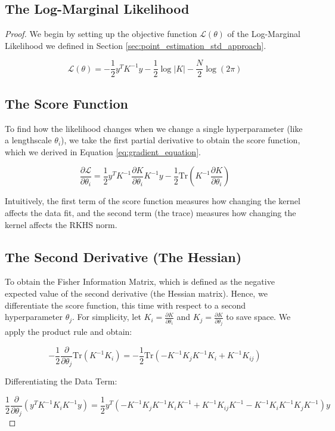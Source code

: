 \documentclass[12pt,oneside]{report}
\theoremstyle{definition}
\theoremstyle{remark}
\begin{document}
\subsection{The Log-Marginal Likelihood}
\begin{proof}
We begin by setting up the objective function $\mathcal{L}(\theta)$ of the Log-Marginal Likelihood we defined in Section \ref{sec:point_estimation_std_approach}.

$$\mathcal{L}(\theta) = -\frac{1}{2} y^T K^{-1} y - \frac{1}{2} \log \vert{}K\vert{} - \frac{N}{2} \log(2\pi)$$

\subsection{The Score Function}
To find how the likelihood changes when we change a single hyperparameter (like a lengthscale $\theta_i$), we take the first partial derivative to obtain the score function, which we derived in Equation \ref{eq:gradient_equation}. 

$$\frac{\partial \mathcal{L}}{\partial \theta_i} = \frac{1}{2} y^T K^{-1} \frac{\partial K}{\partial \theta_i} K^{-1} y - \frac{1}{2} \text{Tr}\left( K^{-1} \frac{\partial K}{\partial \theta_i} \right)$$

Intuitively, the first term of the score function measures how changing the kernel affects the data fit, and the second term (the trace) measures how changing the kernel affects the RKHS norm.

\subsection{The Second Derivative (The Hessian)}

To obtain the Fisher Information Matrix, which is defined as the negative expected value of the second derivative (the Hessian matrix). Hence, we differentiate the score function, this time with respect to a second hyperparameter $\theta_j$. For simplicity, let $K_i = \frac{\partial K}{\partial \theta_i}$ and $K_j = \frac{\partial K}{\partial \theta_j}$ to save space. We apply the product rule and obtain:

$$-\frac{1}{2} \frac{\partial}{\partial \theta_j} \text{Tr}(K^{-1} K_i) = -\frac{1}{2} \text{Tr}\left( -K^{-1} K_j K^{-1} K_i + K^{-1} K_{ij} \right)$$

Differentiating the Data Term:

\begin{equation}
\frac{1}{2} \frac{\partial}{\partial \theta_j} \left( y^T K^{-1} K_i K^{-1} y \right) = \frac{1}{2} y^T \left( -K^{-1} K_j K^{-1} K_i K^{-1} + K^{-1} K_{ij} K^{-1} - K^{-1} K_i K^{-1} K_j K^{-1} \right) y
\label{eq:quadratic_form_fim}
\end{equation}



\end{proof}
\end{document}
